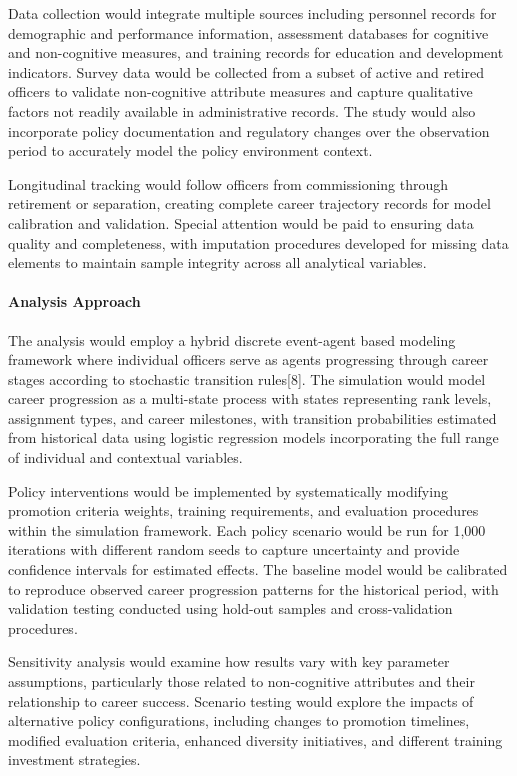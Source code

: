 \documentclass[main.tex]{subfiles}
\begin{document}
Data collection would integrate multiple sources including personnel records for demographic and performance information, assessment databases for cognitive and non-cognitive measures, and training records for education and development indicators. Survey data would be collected from a subset of active and retired officers to validate non-cognitive attribute measures and capture qualitative factors not readily available in administrative records. The study would also incorporate policy documentation and regulatory changes over the observation period to accurately model the policy environment context.

Longitudinal tracking would follow officers from commissioning through retirement or separation, creating complete career trajectory records for model calibration and validation. Special attention would be paid to ensuring data quality and completeness, with imputation procedures developed for missing data elements to maintain sample integrity across all analytical variables.

\paragraph{Analysis Approach}

The analysis would employ a hybrid discrete event-agent based modeling framework where individual officers serve as agents progressing through career stages according to stochastic transition rules[8]. The simulation would model career progression as a multi-state process with states representing rank levels, assignment types, and career milestones, with transition probabilities estimated from historical data using logistic regression models incorporating the full range of individual and contextual variables.

Policy interventions would be implemented by systematically modifying promotion criteria weights, training requirements, and evaluation procedures within the simulation framework. Each policy scenario would be run for 1,000 iterations with different random seeds to capture uncertainty and provide confidence intervals for estimated effects. The baseline model would be calibrated to reproduce observed career progression patterns for the historical period, with validation testing conducted using hold-out samples and cross-validation procedures.

Sensitivity analysis would examine how results vary with key parameter assumptions, particularly those related to non-cognitive attributes and their relationship to career success. Scenario testing would explore the impacts of alternative policy configurations, including changes to promotion timelines, modified evaluation criteria, enhanced diversity initiatives, and different training investment strategies.
\end{document}
